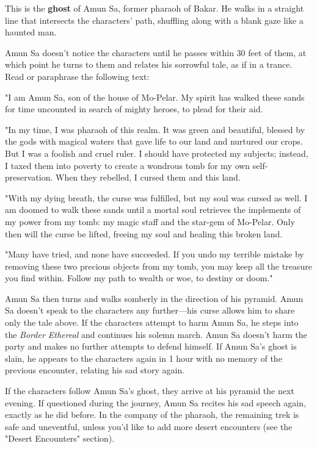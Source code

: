 \documentclass[10pt,a4paper,twoside,bg=print,twocolumn,openany,nodeprecatedcode]{dndbook}
\begin{document}
This is the \textbf{ghost} of Amun Sa, former pharaoh of Bakar. He walks in a straight line that intersects the characters' path, shuffling along with a blank gaze like a haunted man.

Amun Sa doesn't notice the characters until he passes within 30 feet of them, at which point he turns to them and relates his sorrowful tale, as if in a trance. Read or paraphrase the following text:

\begin{DndReadAloud}{}
"I am Amun Sa, son of the house of Mo-Pelar. My spirit has walked these sands for time uncounted in search of mighty heroes, to plead for their aid.

"In my time, I was pharaoh of this realm. It was green and beautiful, blessed by the gods with magical waters that gave life to our land and nurtured our crops. But I was a foolish and cruel ruler. I should have protected my subjects; instead, I taxed them into poverty to create a wondrous tomb for my own self-preservation. When they rebelled, I cursed them and this land.

"With my dying breath, the curse was fulfilled, but my soul was cursed as well. I am doomed to walk these sands until a mortal soul retrieves the implements of my power from my tomb: my magic staff and the star-gem of Mo-Pelar. Only then will the curse be lifted, freeing my soul and healing this broken land.

"Many have tried, and none have succeeded. If you undo my terrible mistake by removing these two precious objects from my tomb, you may keep all the treasure you find within. Follow my path to wealth or woe, to destiny or doom."

\end{DndReadAloud}

Amun Sa then turns and walks somberly in the direction of his pyramid. Amun Sa doesn't speak to the characters any further—his curse allows him to share only the tale above. If the characters attempt to harm Amun Sa, he steps into the \textit{Border Ethereal} and continues his solemn march. Amun Sa doesn't harm the party and makes no further attempts to defend himself. If Amun Sa's ghost is slain, he appears to the characters again in 1 hour with no memory of the previous encounter, relating his sad story again.

If the characters follow Amun Sa's ghost, they arrive at his pyramid the next evening. If questioned during the journey, Amun Sa recites his sad speech again, exactly as he did before. In the company of the pharaoh, the remaining trek is safe and uneventful, unless you'd like to add more desert encounters (see the "Desert Encounters" section).
\end{document}
